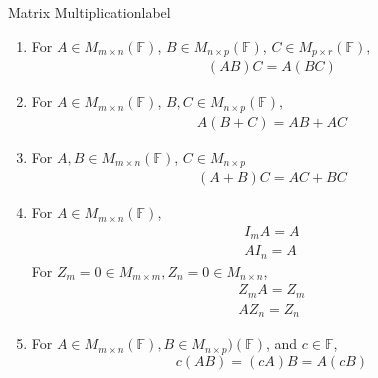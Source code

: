 \documentclass[12pt]{article}
\theoremstyle{definition}
\newcommand{\F}{\ensuremath{\mathbb{F}}}
\begin{document}
\begin{properties}{Matrix Multiplication}{label}
    \begin{enumerate}
        \item 
        For $A \in M_{m \times n}(\F)$, $B \in M_{n\times p}(\F)$, $C \in M_{p \times r}(\F)$,
        \begin{align*}
            (AB)C = A(BC) \tag{Associative}
        \end{align*}
        \item 
        For $A \in M_{m \times n}(\F)$, $B,C\in M_{n\times p}(\F)$,
        \begin{align*}
            A(B + C) = AB + AC \tag{Left distributivity}
        \end{align*}
        \item For $A,B \in M_{m\times n}(\F)$, $C\in M_{n\times p}$
        \begin{align*}
            (A + B)C = AC + BC \tag{Right distributivity}
        \end{align*}
        \item For $A\in M_{m\times n}(\F)$, 
        \begin{align*}
            I_mA = A\\
            AI_n = A
        \end{align*}
        For $Z_m = 0 \in M_{m\times m}, Z_n = 0\in M_{n\times n}$,
        \begin{align*}
            Z_mA = Z_m\\
            AZ_n = Z_n
        \end{align*}
        \item For $A\in M_{m\times n}(\F), B \in M_{n\times p})(\F)$, and $c\in \F$,
        $$c(AB) = (cA)B = A(cB)$$

    \end{enumerate}
\end{properties}
\end{document}
